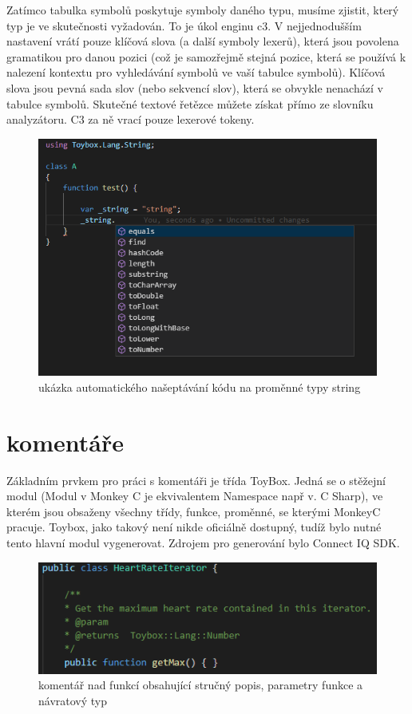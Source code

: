 Zatímco tabulka symbolů poskytuje symboly daného typu, musíme zjistit, který typ je ve skutečnosti vyžadován. To je úkol enginu c3. V nejjednodušším nastavení vrátí pouze klíčová slova (a další symboly lexerů), která jsou povolena gramatikou pro danou pozici (což je samozřejmě stejná pozice, která se používá k nalezení kontextu pro vyhledávání symbolů ve vaší tabulce symbolů). Klíčová slova jsou pevná sada slov (nebo sekvencí slov), která se obvykle nenachází v tabulce symbolů. Skutečné textové řetězce můžete získat přímo ze slovníku analyzátoru. C3 za ně vrací pouze lexerové tokeny.


\begin{figure}[h!]
	\centering
	\includegraphics{images/autocomplete_example}
	\caption{ukázka automatického našeptávání kódu na proměnné typy string}
	\label{img:autocomplete_example}
\end{figure}

\section{komentáře}
Základním prvkem pro práci s komentáři je třída ToyBox. Jedná se o stěžejní modul (Modul v Monkey C je ekvivalentem Namespace např v. C Sharp), ve kterém jsou obsaženy všechny třídy, funkce, proměnné, se kterými MonkeyC pracuje. Toybox, jako takový není nikde oficiálně dostupný, tudíž bylo nutné tento hlavní modul vygenerovat. Zdrojem pro generování bylo Connect IQ SDK.

\begin{figure}
	\centering
	\includegraphics{images/comments}
	\caption{komentář nad funkcí obsahující stručný popis, parametry funkce a návratový typ}
	\label{img:comments}
\end{figure}

